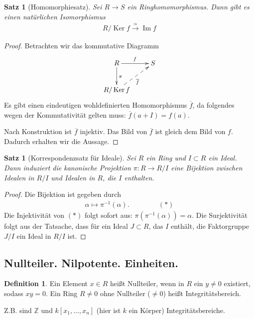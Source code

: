 \documentclass[reqno,12pt]{article}
\numberwithin{equation}{section}
\newcommand{\bZ}{\mathbb{Z}}
\newcommand{\ol}{\overline}
\newcommand{\Ker}{\text{Ker }}
\renewcommand{\Im}{\text{Im }}
\theoremstyle{plain}
\newtheorem{proposition}[thm]{Satz}
\theoremstyle{definition}
\newtheorem{definition}[thm]{Definition}
\renewcommand{\Ker}{\operatorname{Ker}}
\renewcommand{\Im}{\operatorname{Im}}
\begin{document}
\begin{proposition}[Homomorphiesatz]
Sei $R \to S$ ein Ringhomomorphismus. Dann gibt es einen natürlichen Isomorphismus
\begin{align*}
  R/\Ker f \overset{\simeq}{\to} \Im f
\end{align*}
\end{proposition}

\begin{proof}
Betrachten wir das kommutative Diagramm
\begin{align*}
  \xymatrix{
  R \ar[r]^f \ar[d]^{\pi}& S \\
  R/\Ker f \ar@{-->}[ur]_{\ol{f}}
  }
\end{align*}
Es gibt einen eindeutigen wohldefinierten Homomorphismus $\ol{f}$, da folgendes wegen der Kommutativität gelten muss: $\ol{f}(a+I) = f(a)$.

Nach Konstruktion ist $\ol{f}$ injektiv. Das Bild von $\ol{f}$ ist gleich dem Bild von $f$. Dadurch erhalten wir die Aussage.
\end{proof}


\begin{proposition}[Korrespondenzsatz für Ideale]
  Sei $R$ ein Ring und $I \subset R$ ein Ideal. Dann induziert die kanonische Projektion $\pi \colon R \to R/I$ eine Bijektion zwischen Idealen in $R/I$ und Idealen in $R$, die $I$ enthalten.
\end{proposition}

\begin{proof}
Die Bijektion ist gegeben durch
\begin{align*}
  \alpha \mapsto \pi^{-1} (\alpha). \hspace{50pt} (*)
\end{align*}
Die Injektivität von $(*)$ folgt sofort aus: $\pi(\pi^{-1} (\alpha)) = \alpha$. Die Surjektivität folgt aus der Tatsache, dass für ein Ideal $J \subset R$, das $I$ enthält, die Faktorgruppe $J/I$ ein Ideal in $R/I$ ist.
\end{proof}








\subsection{Nullteiler. Nilpotente. Einheiten.}


\begin{definition}
Ein Element $x \in R$ heißt {\sf Nullteiler}, wenn in $R$ ein $y \neq 0$ existiert, sodass $xy=0$. Ein Ring $R \neq 0$ ohne Nullteiler ($\neq 0$) heißt {\sf Integritätsbereich}.
\end{definition}
Z.B. sind $\bZ$ und $k[x_1, \dots, x_n]$ (hier ist $k$ ein Körper) Integritätsbereiche.
\end{document}
